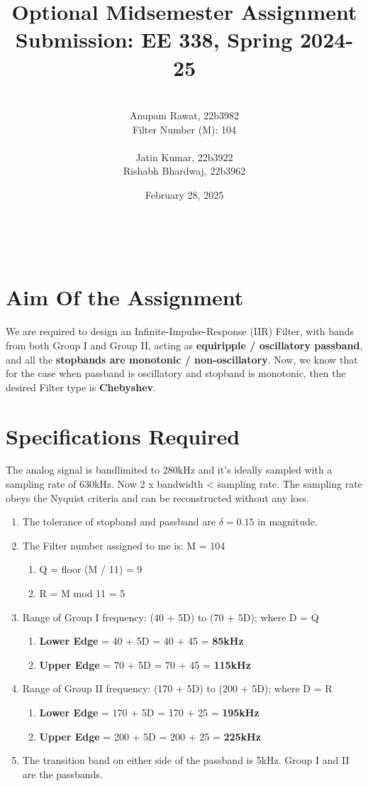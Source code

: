 \documentclass{article}
\title{Optional Midsemester Assignment Submission: EE 338, Spring 2024-25}
\author{
    \IEEEauthorblockN{Submission By:}\\
    Anupam Rawat, 22b3982\\
    Filter Number (M): 104\\
    \hline
    \IEEEauthorblockN{Reviewed By:}\\
    Jatin Kumar, 22b3922\\
    Rishabh Bhardwaj, 22b3962
}
\date{February 28, 2025}
\begin{document}
\maketitle

\\

\section{Aim Of the Assignment}
We are required to design an Infinite-Impulse-Response (IIR) Filter, with bands from both Group I and Group II, acting as \textbf{equiripple / oscillatory passband}, and all the \textbf{stopbands are monotonic / non-oscillatory}. Now, we know that for the case when passband is oscillatory and stopband is monotonic, then the desired Filter type is \textbf{Chebyshev}.

\section{Specifications Required}
The analog signal is bandlimited to 280kHz and it's ideally sampled with a sampling rate of 630kHz. Now 2 x bandwidth < sampling rate. The sampling rate obeys the Nyquist criteria and can be reconstructed without any loss.
\begin{enumerate}
    \item The tolerance of stopband and passband are $\delta = 0.15$ in magnitude.
    \item The Filter number assigned to me is: M = 104
    \begin{enumerate}
        \item Q = floor (M / 11) = 9
        \item R = M mod 11 = 5
    \end{enumerate}
    \item Range of Group I frequency: (40 + 5D) to (70 + 5D); where D = Q
    \begin{enumerate}
        \item \textbf{Lower Edge} = 40 + 5D = 40 + 45 = \textbf{85kHz}
        \item \textbf{Upper Edge} = 70 + 5D = 70 + 45 = \textbf{115kHz}
    \end{enumerate}
    \item Range of Group II frequency: (170 + 5D) to (200 + 5D); where D = R
    \begin{enumerate}
        \item \textbf{Lower Edge} = 170 + 5D = 170 + 25 = \textbf{195kHz}
        \item \textbf{Upper Edge} = 200 + 5D = 200 + 25 = \textbf{225kHz}
    \end{enumerate}
    \item The transition band on either side of the passband is 5kHz. Group I and II are the passbands.
\end{enumerate}
\newpage
\end{document}
